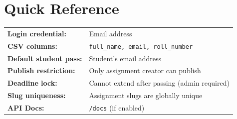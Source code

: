 \documentclass[12pt,a4paper]{article}
\begin{document}
\section{Quick Reference}

\begin{tcolorbox}[colback=mentorPurple!5, colframe=mentorPurple, title={\faBookmark\enspace Mentor Quick Reference}]
\begin{tabular}{ll}
\textbf{Login credential:}    & Email address \\
\textbf{CSV columns:}          & \texttt{full\_name, email, roll\_number} \\
\textbf{Default student pass:} & Student's email address \\
\textbf{Publish restriction:} & Only assignment creator can publish \\
\textbf{Deadline lock:}        & Cannot extend after passing (admin required) \\
\textbf{Slug uniqueness:}      & Assignment slugs are globally unique \\
\textbf{API Docs:}             & \texttt{/docs} (if enabled) \\
\end{tabular}
\end{tcolorbox}

\end{document}
